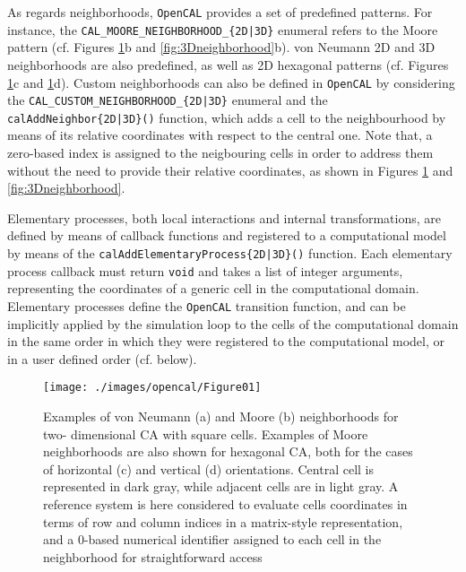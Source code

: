  As regards neighborhoods, \texttt{OpenCAL} provides a set of predefined
patterns. For instance, the \verb'CAL_MOORE_NEIGHBORHOOD_{2D|3D}'
enumeral refers to the Moore pattern (cf. Figures
\ref{fig:2Dneighborhood}b and \ref{fig:3Dneighborhood}b). von
Neumann 2D and 3D neighborhoods are also predefined, as well as 2D
hexagonal patterns (cf. Figures \ref{fig:2Dneighborhood}c and
\ref{fig:2Dneighborhood}d). Custom neighborhoods can also be defined
in \texttt{OpenCAL} by considering the \verb'CAL_CUSTOM_NEIGHBORHOOD_{2D|3D}'
enumeral and the \verb'calAddNeighbor{2D|3D}()' function, which adds
a cell to the neighbourhood by means of its relative coordinates
with respect to the central one. Note that, a zero-based index is
assigned to the neigbouring cells in order to address them without
the need to provide their relative coordinates, as shown in Figures
\ref{fig:2Dneighborhood} and \ref{fig:3Dneighborhood}.

Elementary processes, both local interactions and internal
transformations, are defined by means of callback functions and
registered to a computational model by means of the
\verb'calAddElementaryProcess{2D|3D}()' function. Each elementary
process callback must return \verb'void' and takes a list of integer
arguments, representing the coordinates of a generic cell in the
computational domain. Elementary processes define the \texttt{OpenCAL}
transition function, and can be implicitly applied by the simulation
loop to the cells of the computational domain in the same order in
which they were registered to the computational model, or in a user
defined order (cf. below).

\begin{figure}
	\begin{center}
		\texttt{[image: ./images/opencal/Figure01]}
		\caption{Examples of von Neumann (a) and Moore (b) neighborhoods for two-
			dimensional CA with square cells. Examples of Moore neighborhoods are also shown for hexagonal CA, both for the cases of horizontal (c) and vertical (d) orientations. Central cell is represented in dark gray, while adjacent cells are in light gray. A reference system is here considered to evaluate cells coordinates in terms of row and column indices in a matrix-style representation, and a 0-based numerical identifier assigned to each cell in the neighborhood for straightforward access}
		\label{fig:2Dneighborhood}
	\end{center}
\end{figure}


